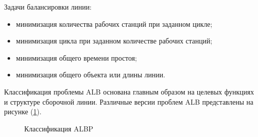 Задачи балансировки линии:

\begin{itemize}
    \item минимизация количества рабочих станций при заданном цикле;
    \item минимизация цикла при заданном количестве рабочих станций;
    \item минимизация общего времени простоя;
    \item минимизация общего объекта или длины линии.
\end{itemize}

Классификация проблемы ALB основана главным образом на целевых функциях и структуре сборочной линии. Различные версии проблем ALB представлены на рисунке (\ref{ris:image1}).

\begin{figure}[H]
    \caption{Классификация ALBP}
    \label{ris:image1}
\end{figure}

